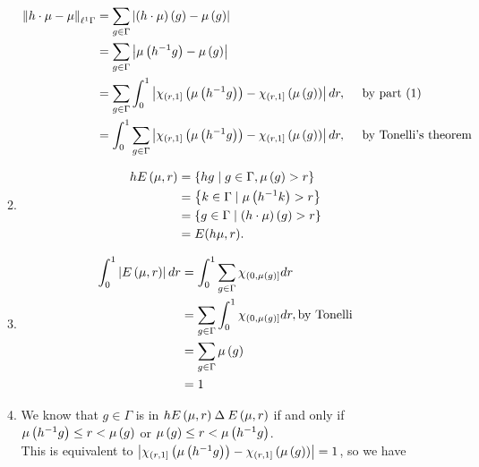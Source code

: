 \documentclass[a4paper,10pt]{report}
\begin{document}
\begin{enumerate}
\begin{enumerate}
                  \begin{align*}
                    \NK h \cdot \mu - \mu \KN_{\ell^1 \Gamma}%
                    &= \sum_{g \in \Gamma} \MG \E h \cdot \mu \R \E g \R - \mu \E g \R \GM\\
                    &= \sum_{g \in \Gamma} \MG \mu \E h^{-1} g \R - \mu \E g \R \GM\\
                    &= \sum_{g \in \Gamma} \I_0^1 \MG \chi_{\E r , 1 \FD} \E \mu \E h^{-1} g \R \R - \chi_{\E r , 1 \FD} \E \mu \E g \R \R \GM dr, \quad \te{ by part (1)}\\
                    &= \I_0^1 \sum_{g \in \Gamma} \MG \chi_{\E r , 1 \FD} \E \mu \E h^{-1} g \R \R - \chi_{\E r , 1 \FD} \E \mu \E g \R \R \GM dr, \quad \te{ by Tonelli's theorem}\\
                  \end{align*}
		\item

                  \begin{align*}
                    h E \E \mu , r \R%
                    &= \ER h g \mid g \in \Gamma, \mu \E g \R > r \RE\\
                    &= \ER k \in \Gamma \mid \mu \E h^{-1} k \R > r \RE\\
                    &= \ER g \in \Gamma \mid \E h \cdot \mu \R \E g \R > r \RE\\
																				&= E(h\mu,r).
                  \end{align*}

		\item

                  \begin{align*}
                    \I_0^1 \MG E \E \mu , r \R \GM dr%
                    &= \I_0^1 \sum_{g \in \Gamma} \chi_{\E 0 , \mu \E g \R \FD} dr\\
                    &= \sum_{g \in \Gamma} \I_0^1 \chi_{\E 0 , \mu \E g \R \FD} dr, \te{by Tonelli}\\
                    &= \sum_{g \in \Gamma} \mu \E g \R\\
                    &= 1
                  \end{align*}

		\item We know that $g \in \Gamma$ is in $h E \left( \mu , r \right) \mathbin{\Delta} E \left( \mu , r \right)$ if and only if $\mu \left( h^{-1} g \right) \leq r < \mu \left( g \right)$ or $\mu \left( g \right) \leq r < \mu \left( h^{-1} g \right)$.\\
                  This is equivalent to $\left| \chi_{\left( r , 1 \right]} \left( \mu \left( h^{-1} g \right) \right) - \chi_{\left( r , 1 \right]} \left( \mu \left( g \right) \right) \right| = 1$, so we have


\end{enumerate}
\end{enumerate}
\end{document}
